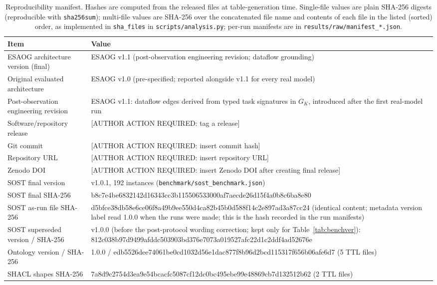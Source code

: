 \begin{table}[H]
\centering
\caption{Reproducibility manifest. Hashes are computed from the released files at table-generation time. Single-file values are plain SHA-256 digests (reproducible with \texttt{sha256sum}); multi-file values are SHA-256 over the concatenated file name and contents of each file in the listed (sorted) order, as implemented in \texttt{sha\_files} in \texttt{scripts/analysis.py}; per-run manifests are in \texttt{results/raw/manifest\_*.json}.}
\label{tab:manifest}
\scriptsize
\begin{tabularx}{\textwidth}{p{3.6cm}X}
\toprule
Item & Value\\
\midrule
ESAOG architecture version (final) & ESAOG v1.1 (post-observation engineering revision; dataflow grounding)\\
Original evaluated architecture & ESAOG v1.0 (pre-specified; reported alongside v1.1 for every real model)\\
Post-observation engineering revision & ESAOG v1.1: dataflow edges derived from typed task signatures in $G_K$, introduced after the first real-model run\\
Software/repository release & [AUTHOR ACTION REQUIRED: tag a release]\\
Git commit & [AUTHOR ACTION REQUIRED: insert commit hash]\\
Repository URL & [AUTHOR ACTION REQUIRED: insert repository URL]\\
Zenodo DOI & [AUTHOR ACTION REQUIRED: insert Zenodo DOI after creating final release]\\
SOST final version & v1.0.1, 192 instances (\texttt{benchmark/sost\_benchmark.json})\\
SOST final SHA-256 & b8c7e4be6832142d16343cc3b115506533000af7aecde26d15f4a0b8c6ba8e80\\
SOST as-run file SHA-256 & d5bfce38db58e6ce06f8a49b9ee550d4ca82b45b0d588f14c2e897ad3a87cc24 (identical content; metadata version label read 1.0.0 when the runs were made; this is the hash recorded in the run manifests)\\
SOST superseded version / SHA-256 & v1.0.0 (before the post-protocol wording correction; kept only for Table~\ref{tab:benchver}): 812c038b97d9499afddc503903bd376e7073a019527afc22d1c2ddf4ad52676e\\
Ontology version / SHA-256 & 1.0.0 / edb5526dee74061be0cd1032d56e1dac877f8b96d2bcd115317f656b06afe6d7 (5 TTL files)\\
SHACL shapes SHA-256 & 7a8d9c2754d3ea9e54bcacfc5087cf12dc0bc495ebe99e48869cb7d132512b62 (2 TTL files)\\

\end{tabularx}
\end{table}
